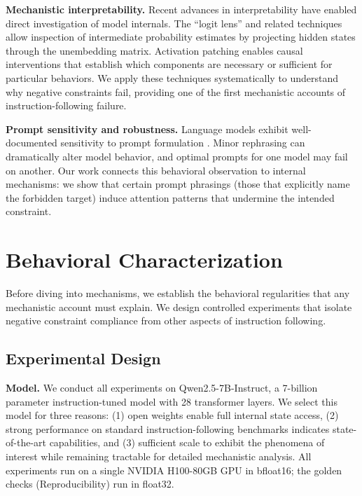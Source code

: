 \documentclass{article}
\begin{document}
\textbf{Mechanistic interpretability.} Recent advances in interpretability have enabled direct investigation of model internals. The ``logit lens'' \citep{nostalgebraist2020logitlens} and related techniques \citep{geva2022transformer} allow inspection of intermediate probability estimates by projecting hidden states through the unembedding matrix. Activation patching \citep{meng2022locating, wang2023interpretability} enables causal interventions that establish which components are necessary or sufficient for particular behaviors. We apply these techniques systematically to understand why negative constraints fail, providing one of the first mechanistic accounts of instruction-following failure.

\textbf{Prompt sensitivity and robustness.} Language models exhibit well-documented sensitivity to prompt formulation \citep{zhao2021calibrate, lu2022fantastically}. Minor rephrasing can dramatically alter model behavior, and optimal prompts for one model may fail on another. Our work connects this behavioral observation to internal mechanisms: we show that certain prompt phrasings (those that explicitly name the forbidden target) induce attention patterns that undermine the intended constraint.

\section{Behavioral Characterization}

Before diving into mechanisms, we establish the behavioral regularities that any mechanistic account must explain. We design controlled experiments that isolate negative constraint compliance from other aspects of instruction following.

\subsection{Experimental Design}

\textbf{Model.} We conduct all experiments on Qwen2.5-7B-Instruct, a 7-billion parameter instruction-tuned model with 28 transformer layers. We select this model for three reasons: (1) open weights enable full internal state access, (2) strong performance on standard instruction-following benchmarks indicates state-of-the-art capabilities, and (3) sufficient scale to exhibit the phenomena of interest while remaining tractable for detailed mechanistic analysis. All experiments run on a single NVIDIA H100-80GB GPU in bfloat16; the golden checks (Reproducibility) run in float32.
\end{document}
